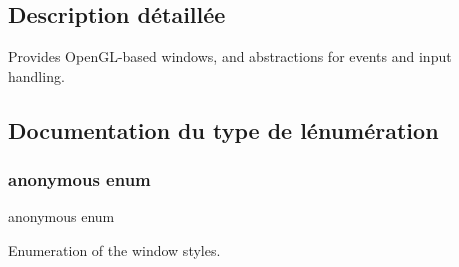 \subsection{Description détaillée}
Provides Open\+G\+L-\/based windows, and abstractions for events and input handling. 

\subsection{Documentation du type de l\textquotesingle{}énumération}
\mbox{\label{group__window_ga8d7a3b8425c907a2872cb57e32cea5b8}} 
\subsubsection{\texorpdfstring{anonymous enum}{anonymous enum}}
{\footnotesize\ttfamily anonymous enum}



Enumeration of the window styles. 

